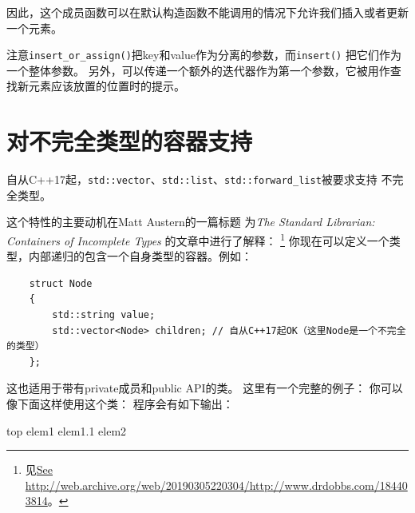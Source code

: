 因此，这个成员函数可以在默认构造函数不能调用的情况下允许我们插入或者更新一个元素。

注意\texttt{insert\_or\_assign()}把key和value作为分离的参数，而\texttt{insert()}
把它们作为一个整体参数。
另外，可以传递一个额外的迭代器作为第一个参数，它被用作查找新元素应该放置的位置时的提示。


\section{对不完全类型的容器支持}
自从C++17起，\texttt{std::vector}、\texttt{std::list}、\texttt{std::forward\_list}被要求支持
不完全类型。

这个特性的主要动机在Matt Austern的一篇标题
为\emph{The Standard Librarian: Containers of Incomplete Types}
的文章中进行了解释：
\footnote{见\url{See http://web.archive.org/web/20190305220304/http://www.drdobbs.com/184403814}。}
你现在可以定义一个类型，内部递归的包含一个自身类型的容器。例如：
\begin{lstlisting}
    struct Node
    {
        std::string value;
        std::vector<Node> children; // 自从C++17起OK（这里Node是一个不完全的类型）
    };
\end{lstlisting}
这也适用于带有private成员和public API的类。
这里有一个完整的例子：
你可以像下面这样使用这个类：
程序会有如下输出：
\begin{blacklisting}
    top
      elem1
        elem1.1
      elem2
\end{blacklisting}



